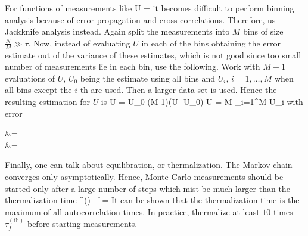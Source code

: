 		For functions of measurements like
		\be \ev U =  \ee
		it becomes difficult to perform binning analysis because of error propagation and cross-correlations. Therefore, us Jackknife analysis instead. Again split the measurements into $M$ bins of size $\frac N M \gg \tau$. Now, instead of evaluating $U$ in each of the bins obtaining the error estimate out of the variance of these estimates, which is not good since too small number of measurements lie in each bin, use the following. Work with $M+1$ evaluations of $U$, $U_0$ being the estimate using all bins and $U_i$, $i=1,\dotsc,M$ when all bins except the $i$-th are used. Then a larger data set is used. Hence the resulting estimation for $U$ is
		\be \ev U = U_0-(M-1)(\overline U -U_0)  \overline U =  M \sum_{i=1}^M U_i \ee
		with error
		\be \begin{split} \Delta &=  \\ &=   \end{split} \ee 

		Finally, one can talk about equilibration, or thermalization. The Markov chain converges only asymptotically. Hence, Monte Carlo measurements should be started only after a large number of steps which mist be much larger than the thermalization time
		\be \tau^{()}_f =  \ee
		It can be shown that the thermalization time is the maximum of all autocorrelation times. In practice, thermalize at least $10$ times $\tau_f^{(\text{th})}$ before starting measurements.




